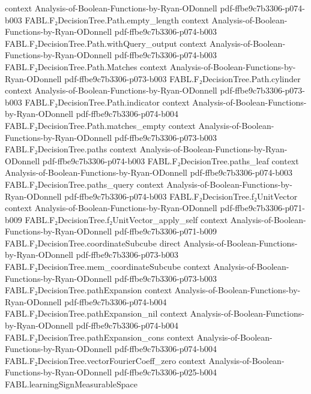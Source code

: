 \begin{theorem}
  {context}
  {Analysis-of-Boolean-Functions-by-Ryan-ODonnell}
  {pdf-ffbe9c7b3306-p074-b003}
\proofstep
  {FABL.F₂DecisionTree.Path.empty_length}
  {context}
  {Analysis-of-Boolean-Functions-by-Ryan-ODonnell}
  {pdf-ffbe9c7b3306-p074-b003}
\proofstep
  {FABL.F₂DecisionTree.Path.withQuery_output}
  {context}
  {Analysis-of-Boolean-Functions-by-Ryan-ODonnell}
  {pdf-ffbe9c7b3306-p074-b003}
\proofstep
  {FABL.F₂DecisionTree.Path.Matches}
  {context}
  {Analysis-of-Boolean-Functions-by-Ryan-ODonnell}
  {pdf-ffbe9c7b3306-p073-b003}
\proofstep
  {FABL.F₂DecisionTree.Path.cylinder}
  {context}
  {Analysis-of-Boolean-Functions-by-Ryan-ODonnell}
  {pdf-ffbe9c7b3306-p073-b003}
\proofstep
  {FABL.F₂DecisionTree.Path.indicator}
  {context}
  {Analysis-of-Boolean-Functions-by-Ryan-ODonnell}
  {pdf-ffbe9c7b3306-p074-b004}
\proofstep
  {FABL.F₂DecisionTree.Path.matches_empty}
  {context}
  {Analysis-of-Boolean-Functions-by-Ryan-ODonnell}
  {pdf-ffbe9c7b3306-p073-b003}
\proofstep
  {FABL.F₂DecisionTree.paths}
  {context}
  {Analysis-of-Boolean-Functions-by-Ryan-ODonnell}
  {pdf-ffbe9c7b3306-p074-b003}
\proofstep
  {FABL.F₂DecisionTree.paths_leaf}
  {context}
  {Analysis-of-Boolean-Functions-by-Ryan-ODonnell}
  {pdf-ffbe9c7b3306-p074-b003}
\proofstep
  {FABL.F₂DecisionTree.paths_query}
  {context}
  {Analysis-of-Boolean-Functions-by-Ryan-ODonnell}
  {pdf-ffbe9c7b3306-p074-b003}
\proofstep
  {FABL.F₂DecisionTree.f₂UnitVector}
  {context}
  {Analysis-of-Boolean-Functions-by-Ryan-ODonnell}
  {pdf-ffbe9c7b3306-p071-b009}
\proofstep
  {FABL.F₂DecisionTree.f₂UnitVector_apply_self}
  {context}
  {Analysis-of-Boolean-Functions-by-Ryan-ODonnell}
  {pdf-ffbe9c7b3306-p071-b009}
\proofstep
  {FABL.F₂DecisionTree.coordinateSubcube}
  {direct}
  {Analysis-of-Boolean-Functions-by-Ryan-ODonnell}
  {pdf-ffbe9c7b3306-p073-b003}
\proofstep
  {FABL.F₂DecisionTree.mem_coordinateSubcube}
  {context}
  {Analysis-of-Boolean-Functions-by-Ryan-ODonnell}
  {pdf-ffbe9c7b3306-p073-b003}
\proofstep
  {FABL.F₂DecisionTree.pathExpansion}
  {context}
  {Analysis-of-Boolean-Functions-by-Ryan-ODonnell}
  {pdf-ffbe9c7b3306-p074-b004}
\proofstep
  {FABL.F₂DecisionTree.pathExpansion_nil}
  {context}
  {Analysis-of-Boolean-Functions-by-Ryan-ODonnell}
  {pdf-ffbe9c7b3306-p074-b004}
\proofstep
  {FABL.F₂DecisionTree.pathExpansion_cons}
  {context}
  {Analysis-of-Boolean-Functions-by-Ryan-ODonnell}
  {pdf-ffbe9c7b3306-p074-b004}
\proofstep
  {FABL.F₂DecisionTree.vectorFourierCoeff_zero}
  {context}
  {Analysis-of-Boolean-Functions-by-Ryan-ODonnell}
  {pdf-ffbe9c7b3306-p025-b004}
\proofstep
  {FABL.learningSignMeasurableSpace}

\end{theorem}
